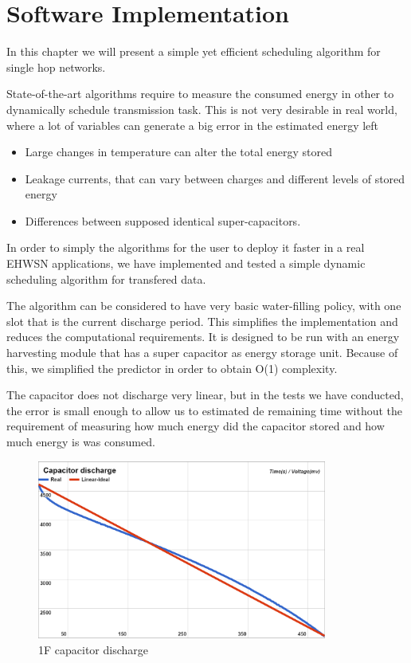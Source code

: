 \normalfont\normalsize
\chapter{Software Implementation}

In this chapter we will present a simple yet efficient scheduling algorithm for single hop networks.

State-of-the-art algorithms require to measure the consumed energy in other to dynamically schedule transmission
task. This is not very desirable in real world, where a lot of variables can generate a big error in the estimated energy left

\begin{itemize}
    \item Large changes in temperature can alter the total energy stored
    \item Leakage currents, that can vary between charges and different levels of stored energy
    \item Differences between supposed identical super-capacitors.
\end{itemize}

In order to simply the algorithms for the user to deploy it faster in a real EHWSN applications,
we have implemented and tested a simple dynamic scheduling algorithm for transfered data.

The algorithm can be considered to have very basic water-filling policy, with one slot that is
the current discharge period. This simplifies the implementation and reduces the computational
requirements. It is designed to be run with an energy harvesting module that has a super capacitor
as energy storage unit. Because of this, we simplified the predictor in order to obtain O(1)
complexity.

The capacitor does not discharge very linear, but in the tests we have conducted, the error is
small enough to allow us to estimated de remaining time without the requirement of measuring how
much energy did the capacitor stored and how much energy is was consumed.

\begin{figure}[ht] \centering
\includegraphics[width=0.85\textwidth]{img/capacitor.png}
\caption{1F capacitor discharge}
\end{figure}


